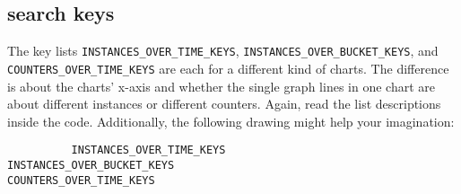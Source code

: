 \documentclass[a4paper,11pt]{article}
\begin{document}
\subsection*{search keys}
The key lists \verb|INSTANCES_OVER_TIME_KEYS|, \verb|INSTANCES_OVER_BUCKET_KEYS|, and \verb|COUNTERS_|\break\verb|OVER_TIME_KEYS| are each for a different kind of charts. The difference is about the charts' x-axis and whether the single graph lines in one chart are about different instances or different counters. Again, read the list descriptions inside the code. Additionally, the following drawing might help your imagination:

\begin{lstlisting}
          INSTANCES_OVER_TIME_KEYS                         INSTANCES_OVER_BUCKET_KEYS                        COUNTERS_OVER_TIME_KEYS


\end{lstlisting}
\end{document}
